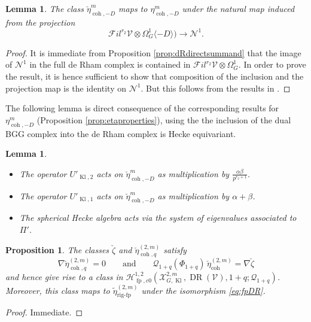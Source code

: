 \documentclass[cjm]{ipart}
\theoremstyle{plain}
\newtheorem{lemma}[theorem]{Lemma}
\newtheorem{proposition}[theorem]{Proposition}
\theoremstyle{remark}
\DeclareMathOperator{\coh}{coh}
\DeclareMathOperator{\DR}{DR}
\DeclareMathOperator{\fp}{fp}
\DeclareMathOperator{\Kl}{Kl}
\DeclareMathOperator{\rigfp}{rig-fp}
\newcommand{\Pif}{\Pi_{\mathrm{f}}}
\newcommand{\cH}{\mathcal{H}}
\newcommand{\cN}{\mathcal{N}}
\newcommand{\cQ}{\mathcal{Q}}
\newcommand{\cV}{\mathcal{V}}
\newcommand{\cX}{\mathcal{X}}
\newcommand{\sFil}{{\mathscr Fil}}
\numberwithin{equation}{subsection}
\begin{document}
  \begin{lemma}
   The class $\breve{\eta}^m_{\coh,-D}$ maps to ${\eta}^m_{\coh,-D}$ under the natural map induced from the projection
   \[ \sFil^{r_2}\cV\otimes\Omega_G^1\langle -D \rangle) \to \cN^1.\]
  \end{lemma}
  \begin{proof}
   It is immediate from Proposition \ref{prop:dRdirectsummand} that the image of $\cN^1$ in the full de Rham complex is contained in $\sFil^{r_2}\cV\otimes\Omega_G^1$. In order to prove the result, it is hence sufficient to show that composition of the inclusion and the projection map is the identity on $\cN^1$.  But this follows from the results in \cite[Ch. VI, \S 6]{faltingschai}.
  \end{proof}

  The following lemma is direct consequence of the corresponding results for $\eta^m_{\coh,-D}$ (Proposition \ref{prop:etaproperties}), %
  using the the inclusion of the dual BGG complex into the de Rham complex is Hecke equivariant.

  \begin{lemma} \
   \begin{itemize}
    \item The operator $U'_{\Kl,2}$ acts on $\breve{\eta}^m_{\coh,-D}$ as multiplication by $\frac{\alpha\beta}{p^{r_2+1}}$.
    \item The operator $U'_{\Kl,1}$ acts on $\breve{\eta}^m_{\coh,-D}$ as multiplication by $\alpha+\beta$.
    \item The spherical Hecke algebra acts via the system of eigenvalues associated to $\Pi'$.
   \end{itemize}
  \end{lemma}
%

  \begin{proposition}\label{prop:etahornsrep}
The classes $\breve{\zeta}$ and $\breve{\eta}^{(2,m)}_{\coh,q}$ satisfy
   \[ \nabla \breve{\eta}^{(2,m)}_{\coh,q}=0\qquad\text{and}\qquad \cQ_{1+q}(\Phi_{1+q})\,\breve{\eta}^{(2,m)}_{\coh}=\nabla\breve{\zeta}\]
   and hence give rise to a class in $\cH^{1, 2}_{\fp,c0}(\cX_{G,\Kl}^{2,m}, \DR(\cV),1+q; \cQ_{1+q})$. Moreover, this class maps to $\tilde\eta^{(2,m)}_{\rigfp}$ under the isomorphism \eqref{eq:fpDR}.
  \end{proposition}
  \begin{proof}
   Immediate.
  \end{proof}
\end{document}
